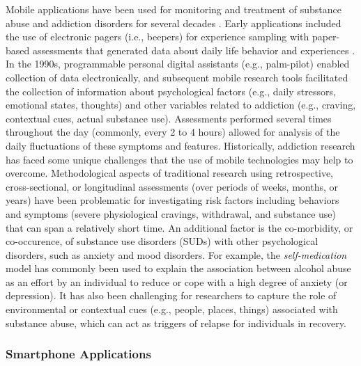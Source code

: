 \documentclass[sigconf]{acmart}
\begin{document}
Mobile applications have been used for monitoring and treatment of substance 
abuse and addiction disorders for several decades \cite{boyer10}. Early 
applications included the use of electronic pagers (i.e., beepers) for 
experience sampling with paper-based assessments that generated data about 
daily life behavior and experiences \cite{swedenson16}. In the 1990s, 
programmable personal digital assistants (e.g., palm-pilot) enabled collection 
of data electronically, and subsequent mobile research tools facilitated the 
collection of information about psychological factors (e.g., daily stressors, 
emotional states, thoughts) and other variables related to addiction (e.g., 
craving, contextual cues, actual substance use). Assessments performed several 
times throughout the day (commonly, every 2 to 4 hours) allowed for analysis of 
the daily fluctuations of these symptoms and features. Historically, addiction 
research has faced some unique challenges that the use of mobile technologies 
may help to overcome. Methodological aspects of traditional research using 
retrospective, cross-sectional, or longitudinal assessments (over periods of 
weeks, months, or years) have been problematic for investigating risk factors 
including behaviors and symptoms (severe physiological cravings, withdrawal, 
and substance use) that can span a relatively short time. An additional factor 
is the co-morbidity, or co-occurence, of substance use disorders (SUDs) with 
other psychological disorders, such as anxiety and mood disorders. For example, 
the {\em self-medication} model has commonly been used to explain the association 
between alcohol abuse as an effort by an individual to reduce or cope with a 
high degree of anxiety (or depression). It has also been challenging for 
researchers to capture the role of environmental or contextual cues (e.g., 
people, places, things) associated with substance abuse, which can act as 
triggers of relapse for individuals in recovery.


\subsubsection*{Smartphone Applications}
\end{document}

